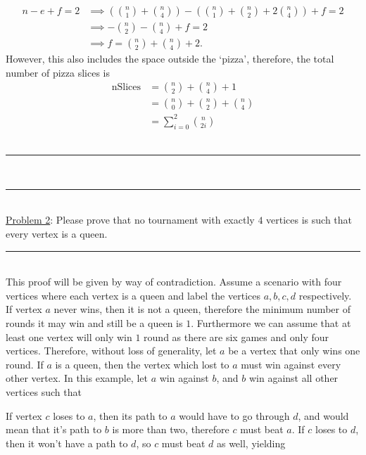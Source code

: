 \documentclass{article}
\newcommand{\problemsep}{\leavevmode\\[0.05in] \rule[\baselineskip/4]{\textwidth}{1pt} \\[0.005in] \rule[\baselineskip]{\textwidth}{1pt}\vspace{-\baselineskip}\leavevmode\\[0.05in]}
\newcommand{\statementsep}{\leavevmode\\[0.005in] \rule[\baselineskip/4]{\textwidth}{0.4pt}\leavevmode\\[0.005in]}
\begin{document}
\begin{equation*}\begin{aligned}
	n - e + f = 2 & \implies \left ({n \choose 1} + {n \choose 4} \right ) - \left ( {n \choose 1} + {n \choose 2} + 2{n\choose 4} \right) + f = 2 \\
				  & \implies -{n \choose 2} - {n \choose 4} + f = 2 \\
				  & \implies f = {n \choose 2} + {n \choose 4} + 2.
\end{aligned}\end{equation*}
However, this also includes the space outside the `pizza', therefore, the total number of pizza slices is 
\begin{equation*}\begin{aligned}
\text{nSlices} &= {n \choose 2} + {n \choose 4} + 1 \\
			   &= {n \choose 0} + {n \choose 2} + {n \choose 4}  \\
			   &= \sum_{i = 0}^2 {n \choose 2i}
\end{aligned}\end{equation*}
\problemsep
\noindent\underline{Problem 2}: 
Please prove that no tournament with exactly $4$ vertices is such that every 
vertex is a queen.
\statementsep
This proof will be given by way of contradiction.  Assume a scenario with four vertices where each vertex is a queen and label the vertices $a,b,c,d$ respectively. If vertex $a$ never wins, then it is not a queen, therefore the minimum number of rounds it may win and still be a queen is $1$. Furthermore we can assume that at least one vertex will only win $1$ round as there are six games and only four vertices. Therefore, without loss of generality, let $a$ be a vertex that only wins one round. If $a$ is a queen, then the vertex which lost to $a$ must win against every other vertex. In this example, let $a$ win against $b$, and $b$ win against all other vertices such that
\begin{center}
\end{center}
If vertex $c$ loses to $a$, then its path to $a$ would have to go through $d$, and would mean that it's path to $b$ is more than two, therefore $c$ must beat $a$. If $c$ loses to $d$, then it won't have a path to $d$, so $c$ must beat $d$ as well, yielding
\end{document}
